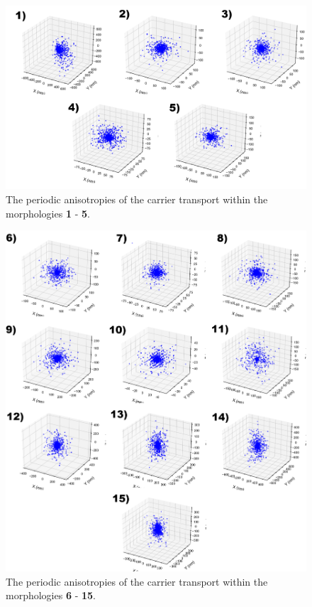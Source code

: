 \documentclass[12pt]{article}
\begin{document}
\begin{figure}[h!]\centering
	\includegraphics[width=\textwidth]{Figures/anisotropyHole.png}
    \caption{The periodic anisotropies of the carrier transport within the morphologies \textbf{1} - \textbf{5}.}
	\label{fig:MSD}
\end{figure}

\begin{figure}[h!]\centering
	\includegraphics[width=\textwidth]{Figures/anisotropyHoleFrame.png}
    \caption{The periodic anisotropies of the carrier transport within the morphologies \textbf{6} - \textbf{15}.}
	\label{fig:MSD}
\end{figure}
\end{document}
